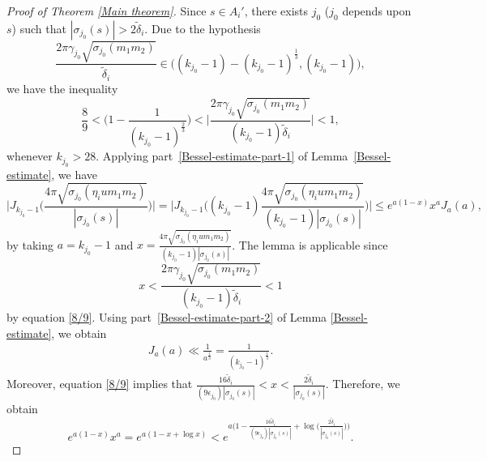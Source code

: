 \documentclass[reqno]{amsart}
\theoremstyle{plain}
\theoremstyle{definition}
\theoremstyle{remark}
\def\log{\operatorname{log}}
\begin{document}
\begin{proof}[Proof of Theorem \ref{Main theorem}]
Since $s\in A_i'$, there exists $j_0$ ($j_0$ depends upon $s$) such that $|\sigma_{j_0}(s)|> 2 \tilde{\delta}_i.$ Due to the hypothesis  $$\frac{2\pi \gamma_{j_0}\sqrt{\sigma_{j_0}(m_1m_2)}}{\tilde{\delta}_i}\in \Big((k_{j_0}  -1)-(k_{j_0}  -1)^{\frac{1}{3}},(k_{j_0}  -1)\Big),$$
 we have the inequality
\begin{equation}\label{8/9}
 \frac{8}{9}< \Bigg(1-\frac{1}{(k_{j_0}-1)^{\frac{2}{3}}}\Bigg) <\Bigg|\frac{2\pi \gamma_{j_0}\sqrt{\sigma_{j_0}(m_1m_2)}}{(k_{j_0}-1)\tilde{\delta}_i}\Bigg|<1,
\end{equation}
whenever $k_{j_0}>28$.
Applying part~\ref{Bessel-estimate-part-1} of Lemma~\ref{Bessel-estimate},  we have
$$\Bigg| J_{k_{j_0}-1}\Big(\frac{4\pi\sqrt{\sigma_{j_0}(\eta_i u m_1m_2)}}{|\sigma_{j_0} (s )| }\Big)\Bigg|=\Bigg| J_{k_{j_0}-1}\Bigg((k_{j_0}-1)\frac{4\pi\sqrt{\sigma_{j_0}(\eta_i u m_1m_2)}}{(k_{j_0}-1)|\sigma_{j_0} (s )|}\Bigg)\Bigg| \leq e^{a(1-x)}x^aJ_a(a),
$$
by taking $a=k_{j_0}-1$ and $x=\frac{4\pi\sqrt{\sigma_{j_0}(\eta_i u m_1m_2)}}{(k_{j_0}-1)|\sigma_{j_0} (s )|}$. The lemma is applicable since $$x< \frac{2\pi\gamma_{j_0} \sqrt{\sigma_{j_0}( m_1m_2)}}{(k_{j_0}-1)\tilde{\delta}_i} <1$$ by equation \eqref{8/9}. 
Using part~\ref{Bessel-estimate-part-2} of Lemma \ref{Bessel-estimate}, we obtain 
\begin{align}\label{Ja(a)}
J_a(a)\ll \frac{1}{a^{\frac{1}{3}}}=\frac{1}{(k_{j_0}-1)^{\frac{1}{3}}}.\end{align}
Moreover, equation \eqref{8/9}  implies that $\frac{16\tilde{\delta}_i}{(9\epsilon_{j_0})|\sigma_{j_0} (s )|}<x<\frac{2\tilde{\delta}_i}{|\sigma_{j_0} (s )|}.$ 
Therefore, we obtain
\begin{equation}\label{Exponential bound}
e^{a(1-x)}x^a = e^{a(1-x + \log x)} < e^{a\Bigg(1-\frac{16\tilde{\delta}_i}{(9\epsilon_{j_0})|\sigma_{j_0}(s )|}+\log\Big(\frac{2\tilde{\delta}_i}{|\sigma_{j_0} (s )|}\Big)\Bigg)}.
\end{equation}


\end{proof}
\end{document}
